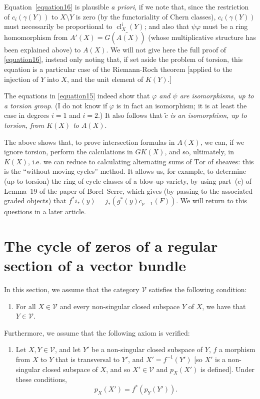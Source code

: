 \documentclass{article}
\theoremstyle{plain}
\theoremstyle{definition}
\newcommand{\cat}{\mathcal}
\DeclareMathOperator{\cl}{cl}
\begin{document}
\begin{enumerate}
    Equation~\cref{equation16} is plausible \emph{a priori}, if we note that, since the restriction of $c_i(\gamma(Y))$ to $X\setminus Y$ is zero (by the functoriality of Chern classes), $c_i(\gamma(Y))$ must necessarily be proportional to $\cl_X^i(Y)$;
    and also that $\psi\varphi$ must be a ring homomorphism from $A'(X)=G(\widetilde{A(X)})$ (whose multiplicative structure has been explained above) to $A(X)$.
    We will not give here the full proof of \cref{equation16}, instead only noting that, if set aside the problem of torsion, this equation is a particular case of the Riemann-Roch theorem [applied to the injection of $Y$ into $X$, and the unit element of $K(Y)$.]

    The equations in \cref{equation15} indeed show that \emph{$\varphi$ and $\psi$ are isomorphisms, up to a torsion group}.
    (I do not know if $\varphi$ is in fact an isomorphism;
    it is at least the case in degrees $i=1$ and $i=2$.)
    It also follows that \emph{$\widetilde{c}$ is an isomorphism, up to torsion, from $K(X)$ to $A(X)$}.

    The above shows that, to prove intersection formulas in $A(X)$, we can, if we ignore torsion, perform the calculations in $GK(X)$, and so, ultimately, in $K(X)$, i.e. we can reduce to calculating alternating sums of $\mathrm{Tor}$ of sheaves:
    this is the ``without moving cycles'' method.
    It allows us, for example, to determine (up to torsion) the ring of cycle classes of a blow-up variety, by using part~(c) of Lemma~19 of the paper of Borel--Serre, which gives (by passing to the associated graded objects) that $f^*i_*(y) = j_*(g^*(y)c_{p-1}(F))$.
    We will return to this questions in a later article.
\end{enumerate}


\section{The cycle of zeros of a regular section of a vector bundle}
\label{section5}

In this section, we assume that the category $\cat{V}$ satisfies the following condition:
\begin{enumerate}[({V}2)]
  \item\label{axiomV2}
    For all $X\in\cat{V}$ and every non-singular closed subspace $Y$ of $X$, we have that $Y\in\cat{V}$.
\end{enumerate}

Furthermore, we assume that the following axiom is verified:
\begin{enumerate}[({A}5)]
  \item\label{axiomA5}
    Let $X,Y\in\cat{V}$, and let $Y'$ be a non-singular closed subspace of $Y$, $f$ a morphism from $X$ to $Y$ that is transversal to $Y'$, and $X'=f^{-1}(Y')$ [so $X'$ is a non-singular closed subspace of $X$, and so $X'\in\cat{V}$ and $p_X(X')$ is defined].
    Under these conditions,
    \[
      p_X(X') = f^*(p_Y(Y')).
    \]
\end{enumerate}
\end{document}
